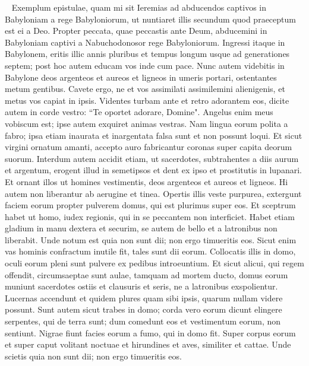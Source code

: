 \begin{biblechapter}    Exemplum epistulae, quam mi sit Ieremias ad abducendos captivos in Babyloniam a rege Babyloniorum, ut nuntiaret illis secundum quod praeceptum est ei a Deo. 
\verse Propter peccata, quae peccastis ante Deum, abducemini in Babyloniam captivi a Nabuchodonosor rege Babyloniorum. 
\verse Ingressi itaque in Babylonem, eritis illic annis pluribus et tempus longum usque ad generationes septem; post hoc autem educam vos inde cum pace. 
\verse Nunc autem videbitis in Babylone deos argenteos et aureos et ligneos in umeris portari, ostentantes metum gentibus.  
\verse Cavete ergo, ne et vos assimilati assimilemini alienigenis, et metus vos capiat in ipsis. 
\verse Videntes turbam ante et retro adorantem eos, dicite autem in corde vestro: “Te oportet adorare, Domine". 
\verse Angelus enim meus vobiscum est; ipse autem exquiret animas vestras. 
\verse Nam lingua eorum polita a fabro; ipsa etiam inaurata et inargentata falsa sunt et non possunt loqui.  
\verse Et sicut virgini ornatum amanti, accepto auro fabricantur 
\verse coronas super capita deorum suorum. Interdum autem accidit etiam, ut sacerdotes, subtrahentes a diis aurum et argentum, erogent illud in semetipsos 
\verse et dent ex ipso et prostitutis in lupanari. Et ornant illos ut homines vestimentis, deos argenteos et aureos et ligneos. 
\verse Hi autem non liberantur ab aerugine et tinea.  
\verse Opertis illis veste purpurea, extergunt faciem eorum propter pulverem domus, qui est plurimus super eos. 
\verse Et sceptrum habet ut homo, iudex regionis, qui in se peccantem non interficiet. 
\verse Habet etiam gladium in manu dextera et securim, se autem de bello et a latronibus non liberabit. Unde notum est quia non sunt dii; 
\verse non ergo timueritis eos. Sicut enim vas hominis confractum inutile fit, tales sunt dii eorum. 
\verse Collocatis illis in domo, oculi eorum pleni sunt pulvere ex pedibus introeuntium. 
\verse Et sicut alicui, qui regem offendit, circumsaeptae sunt aulae, tamquam ad mortem ducto, domus eorum muniunt sacerdotes ostiis et clausuris et seris, ne a latronibus exspolientur. 
\verse Lucernas accendunt et quidem plures quam sibi ipsis, quarum nullam videre possunt. 
\verse Sunt autem sicut trabes in domo; corda vero eorum dicunt elingere serpentes, qui de terra sunt; dum comedunt eos et vestimentum eorum, non sentiunt. 
\verse Nigrae fiunt facies eorum a fumo, qui in domo fit. 
\verse Super corpus eorum et super caput volitant noctuae et hirundines et aves, similiter et cattae. 
\verse Unde scietis quia non sunt dii; non ergo timueritis eos. 

\end{biblechapter}
